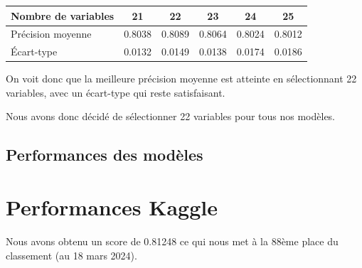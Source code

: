 \documentclass[a4paper]{article}
\begin{document}
    \begin{tabular}{| l | *{5}{c|}}
        \hline
        Nombre de variables & 21 & 22 & 23 & 24 & 25
        \tabularnewline
        \hline
        Précision moyenne & 0.8038 & 0.8089 & 0.8064 & 0.8024 & 0.8012
        \tabularnewline
        \hline
        Écart-type & 0.0132 & 0.0149 & 0.0138 & 0.0174 & 0.0186
        \tabularnewline
        \hline
    \end{tabular}

    On voit donc que la meilleure précision moyenne est atteinte en sélectionnant 22 variables, avec un écart-type
    qui reste satisfaisant.

    Nous avons donc décidé de sélectionner 22 variables pour tous nos modèles.

    \subsection{Performances des modèles}

    \section{Performances Kaggle}

    Nous avons obtenu un score de 0.81248 ce qui nous met à la 88ème place du classement (au 18 mars 2024).
\end{document}
